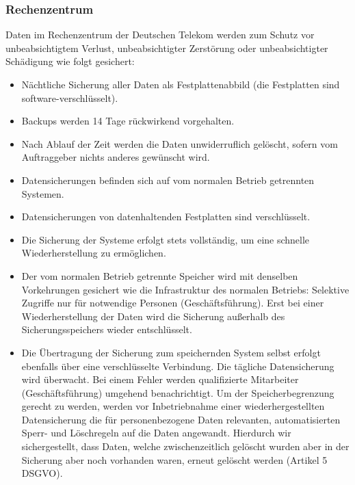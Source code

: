 \documentclass[10pt]{article}
\begin{document}
\subsubsection{Rechenzentrum}
Daten im Rechenzentrum der Deutschen Telekom werden zum Schutz vor unbeabsichtigtem
Verlust, unbeabsichtigter Zerstörung oder unbeabsichtigter Schädigung wie folgt gesichert:
\begin{itemize}
	\item Nächtliche Sicherung aller Daten als Festplattenabbild (die Festplatten sind software-verschlüsselt).
	\item Backups werden 14 Tage rückwirkend vorgehalten.
	\item Nach Ablauf der Zeit werden die Daten unwiderruflich gelöscht, sofern vom Auftraggeber nichts anderes gewünscht wird.
	\item Datensicherungen befinden sich auf vom normalen Betrieb getrennten Systemen.
	\item Datensicherungen von datenhaltenden Festplatten sind verschlüsselt.
	\item Die Sicherung der Systeme erfolgt stets vollständig, um eine schnelle Wiederherstellung zu ermöglichen.
	\item Der vom normalen Betrieb getrennte Speicher wird mit denselben Vorkehrungen gesichert wie die Infrastruktur des normalen Betriebs: Selektive Zugriffe nur für notwendige Personen (Geschäftsführung). Erst bei einer Wiederherstellung der Daten wird die Sicherung außerhalb des Sicherungsspeichers wieder entschlüsselt.
	\item Die Übertragung der Sicherung zum speichernden System selbst erfolgt ebenfalls über eine verschlüsselte Verbindung. Die tägliche Datensicherung wird überwacht. Bei einem Fehler werden qualifizierte Mitarbeiter (Geschäftsführung) umgehend benachrichtigt. Um der Speicherbegrenzung gerecht zu werden, werden vor Inbetriebnahme einer wiederhergestellten Datensicherung die für personenbezogene Daten relevanten, automatisierten Sperr- und Löschregeln auf die Daten angewandt. Hierdurch wir sichergestellt, dass Daten, welche zwischenzeitlich gelöscht wurden aber in der Sicherung aber noch vorhanden waren, erneut gelöscht werden (Artikel 5 DSGVO).
\end{itemize}
\end{document}
